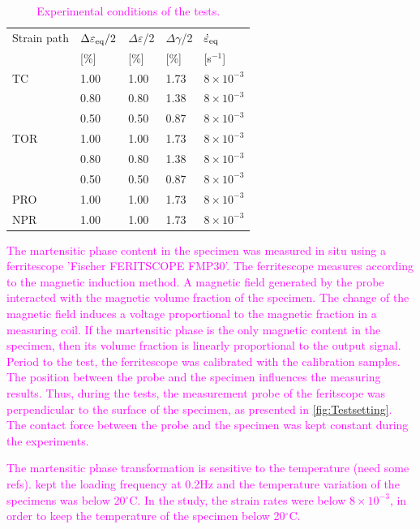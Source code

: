 \documentclass[preprint,5p,twocolumn,10pt,sort&compress]{elsarticle}
\newcommand{\degreeC}{{$^\circ$C}}
\newcommand{\jingyu}[1]{\textcolor{magenta}{#1}}
\begin{document}
\begin{table}[!ht]
  \centering
  \caption{\jingyu{Experimental conditions of the tests.}}
    \begin{tabular}{p{2.0cm}p{1.0cm}<{\centering}p{1cm}<{\centering}p{1cm}<{\centering}p{1.5cm}<{\centering}}
    \toprule
    Strain path & $\Delta \varepsilon _{\rm{eq}}/2$ & $\Delta \varepsilon$/2 & $\Delta \gamma $/2 &$\dot \varepsilon _{\rm{eq}}$ \\
        & [\%]  & [\%] & [\%] & [s$^{-1}$] \\
    \midrule
    TC    & 1.00  & 1.00 & 1.73  & $8\times 10^{-3}$ \\
          & 0.80  & 0.80 & 1.38  & $8\times 10^{-3}$ \\
          & 0.50  & 0.50 & 0.87  & $8\times 10^{-3}$ \\
    \midrule      
    TOR   & 1.00  & 1.00 & 1.73  & $8\times 10^{-3}$ \\
          & 0.80  & 0.80 & 1.38  & $8\times 10^{-3}$ \\
          & 0.50  & 0.50 & 0.87  & $8\times 10^{-3}$ \\
    \midrule
    PRO   & 1.00  & 1.00 & 1.73  & $8\times 10^{-3}$ \\
   	\midrule
    NPR   & 1.00  & 1.00 & 1.73  & $8\times 10^{-3}$ \\
    \bottomrule
    \end{tabular}%
  \label{Tab:test_matrix}%
\end{table}%

\jingyu{The martensitic phase content in the specimen was measured in situ using a ferritescope 'Fischer FERITSCOPE FMP30'. The ferritescope measures according to the magnetic induction method. A magnetic field generated by the probe interacted with the magnetic volume fraction of the specimen. The change of the magnetic field induces a voltage proportional to the magnetic fraction in a measuring coil. If the martensitic phase is the only magnetic content in the specimen, then its volume fraction is linearly proportional to the output signal. Period to the test, the ferritescope was calibrated with the calibration samples. The position between the probe and the specimen influences the measuring results. Thus, during the tests, the measurement probe of the feritscope was perpendicular to the surface of the specimen, as presented in \autoref{fig:Testsetting}. The contact force between the probe and the specimen was kept constant during the experiments.}

\jingyu{The martensitic phase transformation is sensitive to the temperature (need some refs). \cite{Smaga2008Deformation} kept the loading frequency at 0.2Hz and the temperature variation of the specimens was below 20\degreeC. In the study, the strain rates were below $8\times 10^{-3}$, in order to keep the temperature of the specimen below 20\degreeC.}
\end{document}
